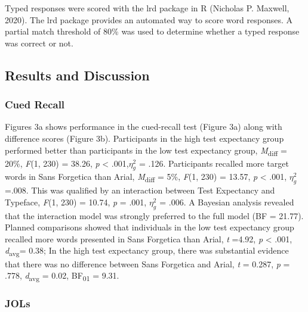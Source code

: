 \documentclass[
  english,
  jou]{apa7}
\begin{document}
Typed responses were scored with the lrd package in R (Nicholas P. Maxwell, 2020). The lrd package provides an automated way to score word responses. A partial match threshold of 80\% was used to determine whether a typed response was correct or not.

\hypertarget{results-and-discussion-1}{%
\subsection{Results and Discussion}\label{results-and-discussion-1}}

\hypertarget{cued-recall}{%
\subsubsection{Cued Recall}\label{cued-recall}}

Figures 3a shows performance in the cued-recall test (Figure 3a) along with difference scores (Figure 3b). Participants in the high test expectancy group performed better than participants in the low test expectancy group, \emph{M}\textsubscript{diff} = 20\%, \emph{F}(1, 230) = 38.26, \emph{p} \textless{} .001,\(\eta_{g}^{2}\) = .126. Participants recalled more target words in Sans Forgetica than Arial, \emph{M}\textsubscript{diff} = 5\%, \emph{F}(1, 230) = 13.57, \emph{p} \textless{} .001, \(\eta_{g}^{2}\) =.008. This was qualified by an interaction between Test Expectancy and Typeface, \emph{F}(1, 230) = 10.74, \emph{p} = .001, \(\eta_{g}^{2}\) = .006. A Bayesian analysis revealed that the interaction model was strongly preferred to the full model (BF = 21.77). Planned comparisons showed that individuals in the low test expectancy group recalled more words presented in Sans Forgetica than Arial, \emph{t} =4.92, \emph{p} \textless{} .001, \emph{d}\textsubscript{avg}= 0.38; In the high test expectancy group, there was substantial evidence that there was no difference between Sans Forgetica and Arial, \emph{t} = 0.287, \emph{p} = .778, \emph{d}\textsubscript{avg} = 0.02, BF\textsubscript{01} = 9.31.

\hypertarget{jols-1}{%
\subsubsection{JOLs}\label{jols-1}}
\end{document}
